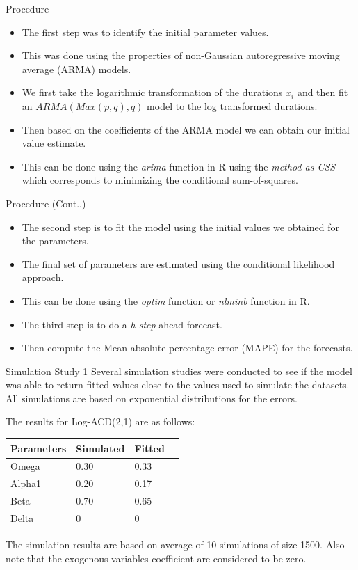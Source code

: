 \documentclass[
  ignorenonframetext,
]{beamer}
\begin{document}
\begin{frame}{Procedure}
\protect\hypertarget{procedure}{}
\begin{itemize}
\item
  The first step was to identify the initial parameter values.
\item
  This was done using the properties of non-Gaussian autoregressive
  moving average (ARMA) models.
\item
  We first take the logarithmic transformation of the durations \(x_i\)
  and then fit an \(ARMA(Max(p,q),q)\) model to the log transformed
  durations.
\item
  Then based on the coefficients of the ARMA model we can obtain our
  initial value estimate.
\item
  This can be done using the \emph{arima} function in R using the
  \emph{method as CSS} which corresponds to minimizing the conditional
  sum-of-squares.
\end{itemize}
\end{frame}

\begin{frame}{Procedure (Cont..)}
\protect\hypertarget{procedure-cont..}{}
\begin{itemize}
\item
  The second step is to fit the model using the initial values we
  obtained for the parameters.
\item
  The final set of parameters are estimated using the conditional
  likelihood approach.
\item
  This can be done using the \emph{optim} function or \emph{nlminb}
  function in R.
\item
  The third step is to do a \emph{h-step} ahead forecast.
\item
  Then compute the Mean absolute percentage error (MAPE) for the
  forecasts.
\end{itemize}
\end{frame}

\begin{frame}{Simulation Study 1}
\protect\hypertarget{simulation-study-1}{}
Several simulation studies were conducted to see if the model was able
to return fitted values close to the values used to simulate the
datasets. All simulations are based on exponential distributions for the
errors.

The results for Log-ACD(2,1) are as follows:

\begin{tabular}{ |p{2cm}|p{2cm}|p{2cm}|p{2cm}|  }
 \hline
 Parameters& Simulated & Fitted \\
 \hline
 Omega   & 0.30 & 0.33 \\
  \hline
 Alpha1   & 0.20 & 0.17 \\
  \hline
 Beta   & 0.70 & 0.65 \\
  \hline
 Delta  & 0  & 0 \\
  \hline
\end{tabular}

The simulation results are based on average of 10 simulations of size
1500. Also note that the exogenous variables coefficient are considered
to be zero.
\end{frame}
\end{document}
